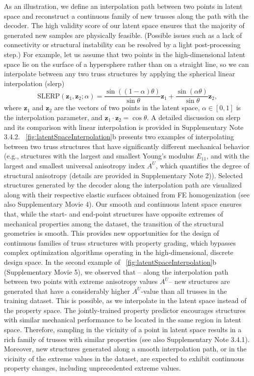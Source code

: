 \documentclass[fleqn,10pt]{wlscirep}
\newcommand{\boldface}[1]{\boldsymbol{#1}}
\newcommand{\bfz}{\boldface{z}}
\begin{document}
As an illustration, we define an interpolation path between two points in latent space and reconstruct a continuous family of new trusses along the path with the decoder. 
The high validity score of our latent space ensures that the majority of generated new samples are physically feasible. (Possible issues such as a lack of connectivity or structural instability can be resolved by a light post-processing step.) For example, let us assume that two points  in the high-dimensional latent space lie on the surface of a hypersphere rather than on a straight line, so we can interpolate between any two truss structures by applying the spherical linear interpolation\cite{shoemake1985animating} (slerp)
\begin{equation}\label{eq:slerp}
    \text{SLERP}(\bfz_1, \bfz_2; \alpha) = \dfrac{\sin\left((1-\alpha)\theta\right)}{\sin\theta}\bfz_1+\dfrac{\sin\left(\alpha\theta\right)}{\sin\theta}\bfz_2,
\end{equation}
where $\bfz_1$ and $\bfz_2$ are the vectors of two points in the latent space, $\alpha \in [0,1]$ is the interpolation parameter, and $\bfz_1\cdot\bfz_2 = \cos\theta$. A detailed discussion on slerp and its comparison with linear interpolation is provided in Supplementary Note 3.4.2. \figureautorefname~\ref{fig:latentSpaceInterpolation}b presents two examples of interpolating between two truss structures that have significantly different mechanical behavior (e.g., structures with the largest and smallest Young's modulus $E_{11}$, and with the largest and smallest universal anisotropy index $A^U$, which quantifies the degree of structural anisotropy \cite{ranganathan2008universal} (details are provided in Supplementary Note 2)). Selected structures generated by the decoder along the interpolation path are visualized along with their respective elastic surfaces obtained from FE homogenization (see also Supplementary Movie 4). Our smooth and continuous latent space ensures that, while the start- and end-point structures have opposite extremes of mechanical properties among the dataset, the transition of the structural geometries is smooth. This provides new opportunities for the design of continuous families of truss structures with property grading, which bypasses complex optimization algorithms operating in the high-dimensional, discrete design space. In the second example of \figureautorefname~\ref{fig:latentSpaceInterpolation}b (Supplementary Movie 5), we observed that -- along the interpolation path between two points with extreme anisotropy values $A^U$-- new structures are generated that have a considerably higher $A^U$-value than all trusses in the training dataset. This is possible, as we interpolate in the latent space instead of the property space. The jointly-trained property predictor encourages structures with similar mechanical performance to be located in the same region in latent space. Therefore,  sampling in the vicinity of a point in latent space results in a rich family of trusses with similar properties (see also Supplementary Note 3.4.1). Moreover, new structures generated along a smooth interpolation path, or in the vicinity of the extreme values in the dataset, are expected to exhibit continuous property changes, including unprecedented extreme values.
\end{document}
